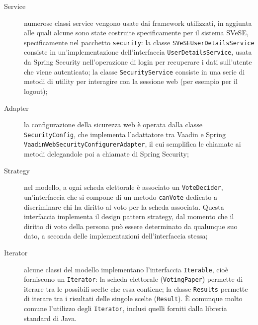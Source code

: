 \begin{description}
	\item[Service] numerose classi service vengono usate dai framework utilizzati, in aggiunta alle quali alcune sono state costruite specificamente per il sistema SVeSE, specificamente nel pacchetto \verb!security!: la classe \verb!SVeSEUserDetailsService! consiste in un'implementazione dell'interfaccia \verb!UserDetailsService!, usata da Spring Security nell'operazione di login per recuperare i dati sull'utente che viene autenticato; la classe \verb!SecurityService! consiste in una serie di metodi di utility per interagire con la sessione web (per esempio per il logout);
	\item[Adapter] la configurazione della sicurezza web è operata dalla classe \verb!SecurityConfig!, che implementa l'adattatore tra Vaadin e Spring \verb!VaadinWebSecurityConfigurerAdapter!, il cui semplifica le chiamate ai metodi delegandole poi a chiamate di Spring Security;
	\item[Strategy] nel modello, a ogni scheda elettorale è associato un \verb!VoteDecider!, un'interfaccia che si compone di un metodo \verb!canVote! dedicato a discriminare chi ha diritto al voto per la scheda associata. Questa interfaccia implementa il design pattern strategy, dal momento che il diritto di voto della persona può essere determinato da qualunque suo dato, a seconda delle implementazioni dell'interfaccia stessa;
	\item[Iterator] alcune classi del modello implementano l'interfaccia \verb!Iterable!, cioè forniscono un \verb!Iterator!: la scheda elettorale (\verb!VotingPaper!) permette di iterare tra le possibili scelte che essa contiene; la classe \verb!Results! permette di iterare tra i risultati delle singole scelte (\verb!Result!). È comunque molto comune l'utilizzo degli \verb!Iterator!, inclusi quelli forniti dalla libreria standard di Java.
\end{description}


